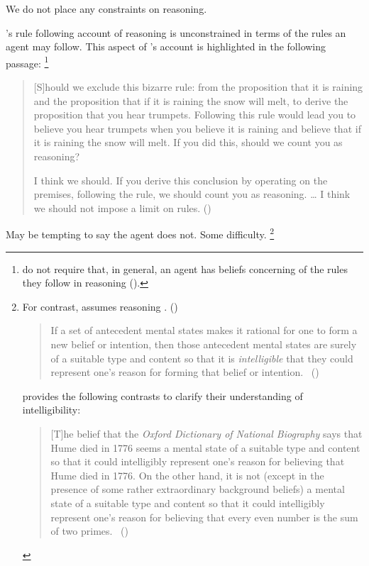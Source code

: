 \begin{note}
  We do not place any constraints on reasoning.

  \citeauthor{Broome:2013aa}'s rule following account of reasoning is unconstrained in terms of the rules an agent may follow.
  This aspect  of \citeauthor{Broome:2013aa}'s account is highlighted in the following passage:%
  \footnote{
     \citeauthor{Broome:2013aa} do not require that, in general, an agent has beliefs concerning of the rules they follow in reasoning (\citeyear[cf.][\S13.2]{Broome:2013aa}).
  }

  \begin{quote}
    [S]hould we exclude this bizarre rule: from the proposition that it is raining and the proposition that if it is raining the snow will melt, to derive the proposition that you hear trumpets.
    Following this rule would lead you to believe you hear trumpets when you believe it is raining and believe that if it is raining the snow will melt.
    If you did this, should we count you as reasoning?

    I think we should.
    If you derive this conclusion by operating on the premises, following the rule, we should count you as reasoning.
    \dots
    I think we should not impose a limit on rules.%
    \mbox{}\hfill\mbox{(\citeyear[233]{Broome:2013aa})}
  \end{quote}

  May be tempting to say the agent does not.
  Some difficulty.%
  \footnote{
    For contrast, \citeauthor{Wedgwood:2006ui} assumes reasoning .%
    (\citeyear[600]{Wedgwood:2006ui})

   \begin{quote}
    If a set of antecedent mental states makes it rational for one to form a new belief or intention, then those antecedent mental states are surely of a suitable type and content so that it is \emph{intelligible} that they could represent one's reason for forming that belief or intention.\newline
    \mbox{ }\hfill\mbox{(\citeyear[662]{Wedgwood:2006ui})}
  \end{quote}

   \citeauthor{Wedgwood:2006ui} provides the following contrasts to clarify their understanding of intelligibility:

  \begin{quote}
    [T]he belief that the \emph{Oxford Dictionary of National Biography} says that Hume died in 1776 seems a mental state of a suitable type and content so that it could intelligibly represent one's reason for believing that Hume died in 1776.
    On the other hand, it is not (except in the presence of some rather extraordinary background beliefs) a mental state of a suitable type and content so that it could intelligibly represent one's reason for believing that every even number is the sum of two primes.%
    \mbox{ }\hfill\mbox{(\citeyear[662]{Wedgwood:2006ui})}
  \end{quote}

}
\end{note}
